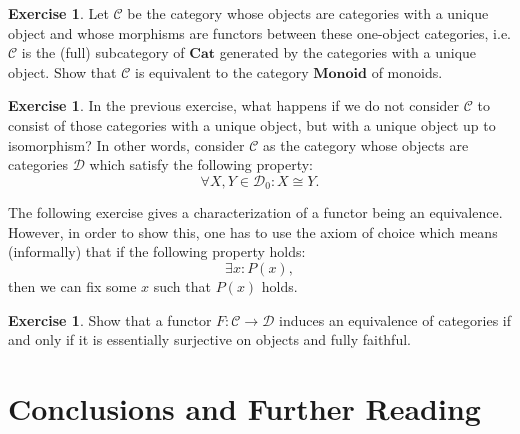 \documentclass[a4paper,10pt]{scrartcl}
\theoremstyle{plain}
\theoremstyle{definition}
\newtheorem{exer}[thm]{Exercise}
\newcommand{\Cat}[1]{\mathcal{#1}}
\newcommand{\CC}{\Cat{C}}
\newcommand{\DD}{\Cat{D}}
\newcommand{\Catb}[1]{\mathbf{#1}}
\newcommand{\CAT}{\Catb{Cat}}
\newcommand{\MON}{\Catb{Monoid}}
\newcommand{\Ob}[1]{{#1}_0}
\begin{document}
\begin{exer} Let $\CC$ be the category whose objects are categories with a unique object and whose morphisms are functors between these one-object categories, i.e. $\CC$ is the (full) subcategory of $\CAT$ generated by the categories with a unique object. Show that $\CC$ is equivalent to the category $\MON$ of monoids.
\end {exer}
\begin {exer}
In the previous exercise, what happens if we do not consider $\CC$ to consist of those categories with a unique object, but with a unique object up to isomorphism? In other words, consider $\CC$ as the category whose objects are categories $\DD$ which satisfy the following property: 
\[
\forall X,Y \in \Ob{\DD}: X\cong Y.
\]
\end{exer}

The following exercise gives a characterization of a functor being an equivalence. However, in order to show this, one has to use the axiom of choice which means (informally) that if the following property holds:
\[ 
\exists x: P(x),
\]
then we can fix some $x$ such that $P(x)$ holds.
\begin{exer} Show that a functor $F:\CC\to\DD$ induces an equivalence of categories if and only if it is essentially surjective on objects and fully faithful.
\end{exer}









\section{Conclusions and Further Reading}
\end{document}

